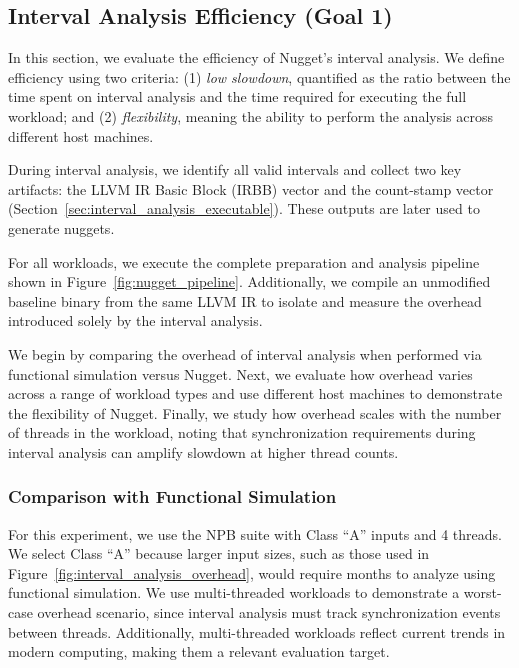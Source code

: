 \subsection{Interval Analysis Efficiency (Goal 1)}\label{sec:interval_analysis_efficiency}

In this section, we evaluate the efficiency of Nugget's interval analysis.
We define efficiency using two criteria:
(1) \emph{low slowdown}, quantified as the ratio between the time spent on interval analysis and the time required for executing the full workload; and
(2) \emph{flexibility}, meaning the ability to perform the analysis across different host machines.

During interval analysis, we identify all valid intervals and collect two key artifacts: the LLVM IR Basic Block (IRBB) vector and the count-stamp vector (Section~\ref{sec:interval_analysis_executable}).
These outputs are later used to generate nuggets.

For all workloads, we execute the complete preparation and analysis pipeline shown in Figure~\ref{fig:nugget_pipeline}.
Additionally, we compile an unmodified baseline binary from the same LLVM IR to isolate and measure the overhead introduced solely by the interval analysis.

We begin by comparing the overhead of interval analysis when performed via functional simulation versus Nugget.
Next, we evaluate how overhead varies across a range of workload types and use different host machines to demonstrate the flexibility of Nugget.
Finally, we study how overhead scales with the number of threads in the workload, noting that synchronization requirements during interval analysis can amplify slowdown at higher thread counts.

\subsubsection{Comparison with Functional Simulation}
\label{sec:comparison_with_functional_simulation}

For this experiment, we use the NPB suite with Class ``A'' inputs and 4 threads.
We select Class ``A'' because larger input sizes, such as those used in Figure~\ref{fig:interval_analysis_overhead}, would require months to analyze using functional simulation.
We use multi-threaded workloads to demonstrate a worst-case overhead scenario, since interval analysis must track synchronization events between threads.
Additionally, multi-threaded workloads reflect current trends in modern computing, making them a relevant evaluation target.


